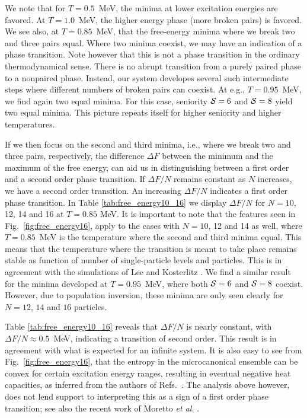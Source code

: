 \begin{multicols}{2}
We note that for $T=0.5$~MeV, the minima at lower excitation
energies are favored. 
At $T=1.0$~MeV, the higher energy
phase (more broken pairs) is favored.
We see also, at $T=0.85$~MeV, that 
the free-energy minima where we break two and three pairs 
equal. 
Where two minima coexist, we may have an
indication  of a phase transition. Note however that this is not a 
phase transition in the ordinary thermodynamical sense.
There is no abrupt transition from a purely paired phase to a 
nonpaired phase.  
Instead, our system developes several such intermediate steps
where different numbers of broken pairs can coexist. 
At e.g., $T=0.95$~MeV, we find again two equal minima. For this case,
seniority ${\cal S}=6$ and ${\cal S}=8$ yield two equal minima.
This picture repeats itself for higher seniority and higher temperatures.

If we then focus on the second and third minima, i.e., where we break
two and three pairs, respectively, the difference $\Delta F$ between the 
minimum and the maximum of the free energy, can aid us in distinguishing
between a first order and a second order phase transition. If $\Delta F/N$
remains constant as $N$
increases, we have a second order transition. An increasing $\Delta F/N$
indicates a first order phase transition. 
In Table \ref{tab:free_energy10_16} we display $\Delta F/N$ for 
$N=10$, 12, 14 and 16 at $T=0.85$ MeV. 
It is important to note that the features
seen in Fig.~\ref{fig:free_energy16}, apply to the cases with $N=10$, 12 
and 14 as well, where $T=0.85$~MeV is the temperature where the second and
third minima equal. This means that the temperature where the transition
is meant to take place remains stable as function of number of single-particle
levels and particles. This is in agreement with the simulations of 
Lee and Kosterlitz \cite{prl90}. We find a similar result for the minima
developed at $T=0.95$~MeV, where both ${\cal S}=6$ and ${\cal S}=8$ coexist.
However, due to population inversion, these minima are only seen clearly
for $N=12$, $14$ and $16$ particles.

Table \ref{tab:free_energy10_16} reveals that $\Delta F/N$ is nearly
constant, with  $\Delta F/N\approx 0.5$~MeV, indicating a 
transition of second order. This result is in 
agreement with what is expected for an infinite system. 
It is also easy to see from Fig.~\ref{fig:free_energy16},
that the entropy in the microcanonical ensemble can be convex for 
certain excitation energy ranges, resulting in eventual negative 
heat capacities, as inferred from the 
authors of Refs.~\cite{huller,gross}. The analysis
above however, does not lend
support to interpreting this as a sign of a first order phase transition; see
also the recent work of Moretto {\em et al.} \cite{moretto01}.


\end{multicols}

